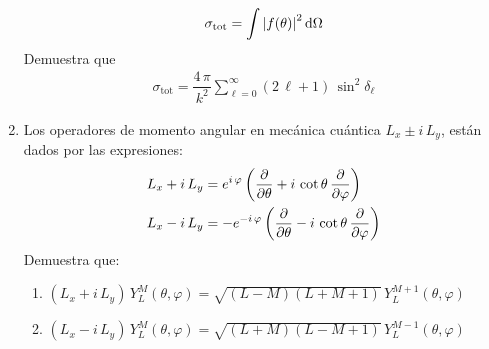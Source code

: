 \begin{enumerate}
\begin{align*}
\sigma_{\text{tot}} = \int \abs{f(\theta)}^{2} \dd{\Omega}
\end{align*}
Demuestra que
\begin{align*}
\sigma_{\text{tot}} = \dfrac{4 \, \pi}{k^{2}} \sum_{\ell=0}^{\infty} (2 \, \ell + 1) \, \sin^{2} \delta_{\ell}
\end{align*}
\item Los operadores de momento angular en mecánica cuántica $L_{x} \pm i \, L_{y}$, están dados por las expresiones:
\begin{align*}
L_{x} + i \, L_{y} &= e^{i \, \varphi} \left( \pdv{\theta} + i \, \cot \theta \, \pdv{\varphi} \right) \\
L_{x} - i \, L_{y} &= -e^{-i \, \varphi} \left( \pdv{\theta} - i \, \cot \theta \, \pdv{\varphi} \right)
\end{align*}
Demuestra que:
\begin{enumerate}
\itemsep1em
\item $(L_{x} + i \, L_{y}) \, Y_{L}^{M} (\theta, \varphi) = \sqrt{(L - M)(L + M + 1)} \, Y_{L}^{M+1} (\theta, \varphi)$
\item $(L_{x} - i \, L_{y}) \, Y_{L}^{M} (\theta, \varphi) = \sqrt{(L + M)(L - M + 1)} \, Y_{L}^{M-1} (\theta, \varphi)$
\end{enumerate}
\end{enumerate}

